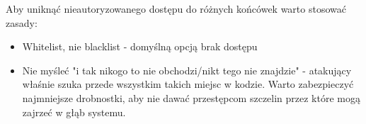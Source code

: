 Aby uniknąć nieautoryzowanego dostępu do różnych końcówek warto stosować zasady:
\begin{itemize}
    \item Whitelist, nie blacklist - domyślną opcją brak dostępu
    \item Nie myśleć "i tak nikogo to nie obchodzi/nikt tego nie znajdzie" - atakujący właśnie szuka przede wszystkim takich miejsc w kodzie. Warto zabezpieczyć najmniejsze drobnostki, aby nie dawać przestępcom szczelin przez które mogą zajrzeć w głąb systemu.
\end{itemize}
